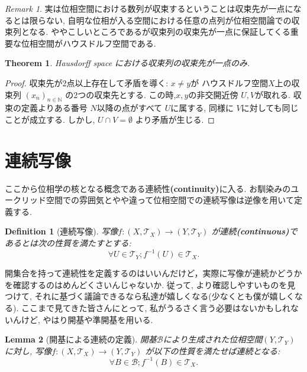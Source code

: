 \documentclass[dvipdfmx]{jbook}
\newtheorem{theorem}{Theorem}[section]
\newtheorem{lemma}[theorem]{Lemma}
\newtheorem{definition}{Definition}[section]
\theoremstyle{remark}
\newtheorem{remark}{Remark}[section]
\theoremstyle{plain}
\begin{document}
\begin{remark}
実は位相空間における数列が収束するということは収束先が一点になるとは限らない, 自明な位相が入る空間における任意の点列が位相空間論での収束列となる. 
ややこしいところであるが収束列の収束先が一点に保証してくる重要な位相空間がハウスドルフ空間である.	
\end{remark}

\begin{theorem}
Hausdorff space における収束列の収束先が一点のみ.
\end{theorem}

\begin{proof}
	収束先が2点以上存在して矛盾を導く: $x \neq y$が ハウスドルフ空間$X$上の収束列 $\left( x_n \right) _{n \in \mathbb{N} }$ の2つの収束先とする. 
	この時,$x,y$の非交開近傍 $U,V$が取れる. 
	収束の定義よりある番号 $N$以降の点がすべて $U$に属する, 同様に $V$に対しても同じことが成立する. 
	しかし,  $U\cap V = \emptyset$ より矛盾が生じる.
\end{proof}

\section{連続写像}%
\label{sec:連続写像}
ここから位相学の核となる概念である連続性\textbf{(continuity)}に入る.
お馴染みのユークリッド空間での雰囲気とやや違って位相空間での連続写像は逆像を用いて定義する.
\begin{definition}[連続写像]
	写像$f: \left( X , \mathcal{T}_X \right) \to \left( Y, \mathcal{T}_Y \right) $ が連続\textbf{(continuous)}であるとは次の性質を満たすとする:
	\[
	\forall U \in \mathcal{T}_Y; f^{-1}\left( U \right) \in \mathcal{T}_X 
	.\] 
\end{definition}

開集合を持って連続性を定義するのはいいんだけど，実際に写像が連続かどうかを確認するのはめんどくさいんじゃないか. 
従って, より確認しやすいものを見つけて, それに基づく議論できるなら私達が嬉しくなる(少なくとも僕が嬉しくなる). 
ここまで見てきた皆さんにとって, 私がうるさく言う必要はないかもしれないんけど, やはり開基や準開基を用いる.

\begin{lemma}[開基による連続の定義]
開基$\mathcal{B}$により生成された位相空間$\left( Y, \mathcal{T}_Y \right) $に対し,
写像$f: \left( X , \mathcal{T}_X \right) \to \left( Y, \mathcal{T}_Y \right) $ が以下の性質を満たせば連続となる:
\[
\forall B \in \mathcal{B}; f^{-1}\left( B \right) \in \mathcal{T}_X
.\] 

\end{lemma}
\end{document}
